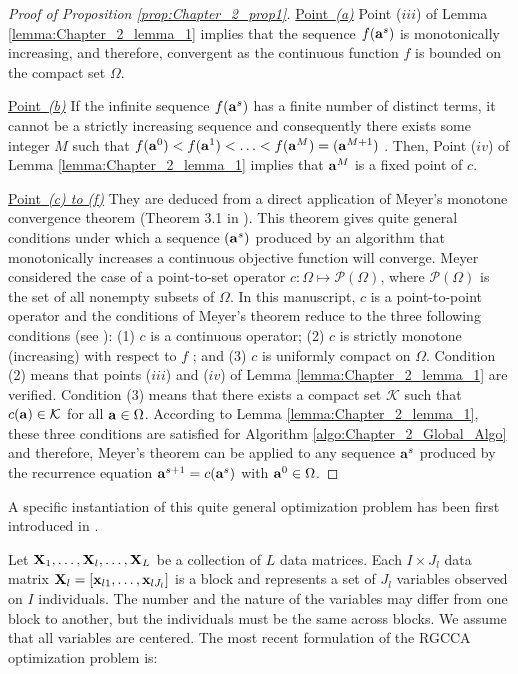 \documentclass[
]{jss}
\begin{document}
\begin{proof}[Proof of Proposition \ref{prop:Chapter_2_prop1}]

    \underline{Point~\textit{(a)}} Point ($iii$) of Lemma \ref{lemma:Chapter_2_lemma_1} implies that the sequence ${ f (\mathbf{a}^s )}$ is monotonically increasing, and therefore, convergent as the continuous function $f$ is bounded on the compact set $\Omega$.

    \underline{Point~\textit{(b)}} If the infinite sequence ${ f (\mathbf{a}^s )}$ has a finite number of distinct terms, it cannot be a strictly increasing sequence and consequently there exists some integer $M$ such that $f (\mathbf{a}^0 ) < f (\mathbf{a}^1 ) < \ldots < f (\mathbf{a}^M ) = (\mathbf{a}^{M+1})$ . Then, Point ($iv$) of Lemma \ref{lemma:Chapter_2_lemma_1} implies that $\mathbf{a}^M$ is a fixed point of $c$.

    \underline{Point~\textit{(c) to (f)}} They are deduced from a direct application of Meyer’s monotone convergence theorem (Theorem 3.1 in \citep{Meyer1976}). This theorem gives quite general conditions under which a sequence ${(\mathbf{a}^s)}$ produced by an algorithm that monotonically increases a continuous objective function will converge. Meyer considered the case of a point-to-set operator $c:\Omega\mapsto\mathcal{P}(\Omega)$, where $\mathcal{P}(\Omega)$ is the set of all nonempty subsets of $\Omega$. In this manuscript, $c$ is a point-to-point operator and the conditions of Meyer’s theorem reduce to the three following conditions (see \citep{Fessler2004}): (1) $c$ is a continuous operator; (2) $c$ is strictly monotone (increasing) with respect to $f$ ; and (3) $c$ is uniformly compact on $\Omega$. Condition (2) means that points ($iii$) and ($iv$) of Lemma \ref{lemma:Chapter_2_lemma_1} are verified. Condition (3) means that there exists a compact set $\mathcal{K}$ such that $c (\mathbf{a}) \in \mathcal{K}$ for all $\mathbf{a}\in\Omega$. According to Lemma \ref{lemma:Chapter_2_lemma_1}, these three conditions are satisfied for Algorithm \ref{algo:Chapter_2_Global_Algo} and therefore, Meyer’s theorem can be applied to any sequence ${\mathbf{a}^s}$ produced by the recurrence equation $\mathbf{a}^{s+1} = c(\mathbf{a}^s)$ with $\mathbf{a}^0\in\Omega$.

\end{proof}

A specific instantiation of this quite general optimization problem has
been first introduced in \citet{Tenenhaus2017}.

Let \(\mathbf{X}_1, \ldots, \mathbf{X}_l, \ldots, \mathbf{X}_L\) be a collection of \(L\) data
matrices. Each \(I \times J_l\) data matrix
\(\mathbf{X}_l=[\mathbf{x}_{l1}, \ldots,\mathbf{x}_{lJ_l}]\) is a block and represents a
set of \(J_l\) variables observed on \(I\) individuals. The number and
the nature of the variables may differ from one block to another, but
the individuals must be the same across blocks. We assume that all
variables are centered. The most recent formulation of the RGCCA
optimization problem \citep{Tenenhaus2017} is:
\end{document}
